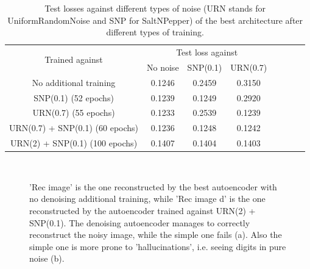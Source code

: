 \documentclass[a4paper, 11pt]{article}
\begin{document}
    \begin{table}[H]
      \centering
      \begin{tabular}{c|ccccccc}
        \multirow{2}{*}{Trained against} & \multicolumn{3}{c}{Test loss against} \\
          & No noise & SNP(0.1) & URN(0.7) \\
        \midrule
        No additional training & 0.1246 & 0.2459 & 0.3150 \\
        SNP(0.1) (52 epochs) & 0.1239 & 0.1249 & 0.2920 \\
        URN(0.7) (55 epochs) & 0.1233 & 0.2539 & 0.1239 \\
        URN(0.7) + SNP(0.1) (60 epochs) & 0.1236 & 0.1248 & 0.1242 \\
        URN(2) + SNP(0.1) (100 epochs) & 0.1407 & 0.1404 & 0.1403 \\
        \bottomrule

      \end{tabular}
      \caption{Test losses against different types of noise (URN stands for UniformRandomNoise and SNP for SaltNPepper) of the best architecture after different types of training.}
      \label{tab:denoising_loss}
    \end{table}

    \begin{figure}
      \centering
       \,
      \caption{'Rec image' is the one reconstructed by the best autoencoder with no denoising additional training, while 'Rec image d' is the one reconstructed by the autoencoder trained against URN(2) + SNP(0.1). The denoising autoencoder manages to correctly reconstruct the noisy image, while the simple one fails (a). Also the simple one is more prone to 'hallucinations', i.e. seeing digits in pure noise (b).}
      \label{fig:hallucination}
    \end{figure}
\end{document}

